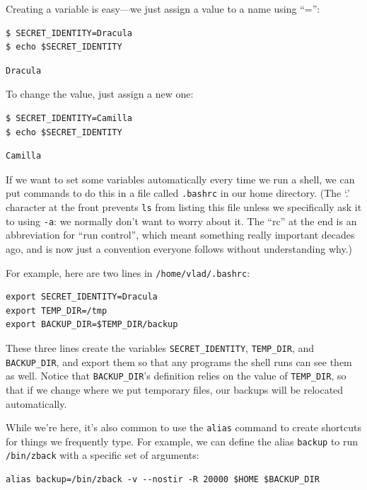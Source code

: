 \documentclass{book}
\begin{document}
Creating a variable is easy---we just assign a value to a name using
``='':

\begin{verbatim}
$ SECRET_IDENTITY=Dracula
$ echo $SECRET_IDENTITY
\end{verbatim}

\begin{verbatim}
Dracula
\end{verbatim}

To change the value, just assign a new one:

\begin{verbatim}
$ SECRET_IDENTITY=Camilla
$ echo $SECRET_IDENTITY
\end{verbatim}

\begin{verbatim}
Camilla
\end{verbatim}

If we want to set some variables automatically every time we run a
shell, we can put commands to do this in a file called \texttt{.bashrc}
in our home directory. (The `.' character at the front prevents
\texttt{ls} from listing this file unless we specifically ask it to
using \texttt{-a}: we normally don't want to worry about it. The ``rc''
at the end is an abbreviation for ``run control'', which meant something
really important decades ago, and is now just a convention everyone
follows without understanding why.)

For example, here are two lines in \texttt{/home/vlad/.bashrc}:

\begin{verbatim}
export SECRET_IDENTITY=Dracula
export TEMP_DIR=/tmp
export BACKUP_DIR=$TEMP_DIR/backup
\end{verbatim}

These three lines create the variables \texttt{SECRET\_IDENTITY},
\texttt{TEMP\_DIR}, and \texttt{BACKUP\_DIR}, and export them so that
any programs the shell runs can see them as well. Notice that
\texttt{BACKUP\_DIR}'s definition relies on the value of
\texttt{TEMP\_DIR}, so that if we change where we put temporary files,
our backups will be relocated automatically.

While we're here, it's also common to use the \texttt{alias} command to
create shortcuts for things we frequently type. For example, we can
define the alias \texttt{backup} to run \texttt{/bin/zback} with a
specific set of arguments:

\begin{verbatim}
alias backup=/bin/zback -v --nostir -R 20000 $HOME $BACKUP_DIR
\end{verbatim}
\end{document}
